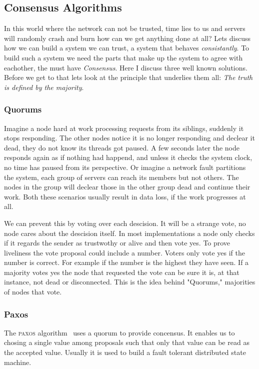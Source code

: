 \subsection{Consensus Algorithms}
In this world where the network can not be trusted, time lies to us and servers will randomly crash and burn how can we get anything done at all? Lets discuss how we can build a system we can trust, a system that behaves \textit{consistantly}. To build such a system we need the parts that make up the system to agree with eachother, the must have \emph{Consensus}. Here I discuss three well known solutions. Before we get to that lets look at the principle that underlies them all: \emph{The truth is defined by the majority}.

\subsubsection*{Quorums}
Imagine a node hard at work processing requests from its siblings, suddenly it stops responding. The other nodes notice it is no longer responding and declear it dead, they do not know its threads got paused. A few seconds later the node responds again as if nothing had happend, and unless it checks the system clock, no time has paused from its perspective. Or imagine a network fault partitions the system, each group of servers can reach its members but not others. The nodes in the group will declear those in the other group dead and continue their work. Both these scenarios usually result in data loss, if the work progresses at all.

We can prevent this by voting over each descision. It will be a strange vote, no node cares about the descision itself. In most implementations a node only checks if it regards the sender as trustwothy or alive and then vote yes. To prove liveliness the vote proposal could include a number. Voters only vote yes if the number is correct. For example if the number is the highest they have seen. If a majority votes yes the node that requested the vote can be sure it is, at that instance, not dead or disconnected. This is the idea behind "Quorums," majorities of nodes that vote.

\subsubsection*{Paxos}
The \textsc{paxos} algorithm~\cite{paxos} uses a quorum to provide concensus. It enables us to chosing a single value among proposals such that only that value can be read as the accepted value. Usually it is used to build a fault tolerant distributed state machine. 

